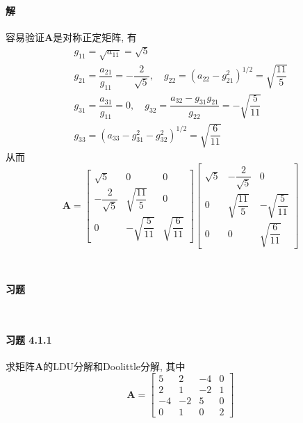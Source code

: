 \documentclass[12pt, a4paper, oneside, fontset=none]{ctexart}
\begin{document}
\paragraph*{解} 容易验证$\bm{A}$是对称正定矩阵, 有
\begin{gather*}
    g_{11} = \sqrt{a_{11}} = \sqrt{5} \\
    g_{21} = \dfrac{a_{21}}{g_{11}} = -\dfrac{2}{\sqrt{5}}, \quad g_{22} = (a_{22} - g_{21}^2)^{1/2} = \sqrt{\dfrac{11}{5}} \\
    g_{31} = \dfrac{a_{31}}{g_{11}} = 0, \quad g_{32} = \dfrac{a_{32} - g_{31}g_{21}}{g_{22}} = -\sqrt{\dfrac{5}{11}} \\
    g_{33} = (a_{33} - g_{31}^2 - g_{32}^2)^{1/2} = \sqrt{\dfrac{6}{11}}
\end{gather*}
从而
\[
    \bm{A} = \begin{bmatrix}
        \sqrt{5}             & 0                     & 0                    \\
        -\dfrac{2}{\sqrt{5}} & \sqrt{\dfrac{11}{5}}  & 0                    \\
        0                    & -\sqrt{\dfrac{5}{11}} & \sqrt{\dfrac{6}{11}}
    \end{bmatrix} \begin{bmatrix}
        \sqrt{5} & -\dfrac{2}{\sqrt{5}} & 0                     \\
        0        & \sqrt{\dfrac{11}{5}} & -\sqrt{\dfrac{5}{11}} \\
        0        & 0                    & \sqrt{\dfrac{6}{11}}
    \end{bmatrix}
\]

\par \ \par

\centerline{\large{\textbf{习题}}} \ \par

\paragraph*{习题 4.1.1} 求矩阵$\bm{A}$的LDU分解和Doolittle分解, 其中
\[
    \bm{A} = \begin{bmatrix}
        5  & 2  & -4 & 0 \\
        2  & 1  & -2 & 1 \\
        -4 & -2 & 5  & 0 \\
        0  & 1  & 0  & 2
    \end{bmatrix}
\]
\end{document}
